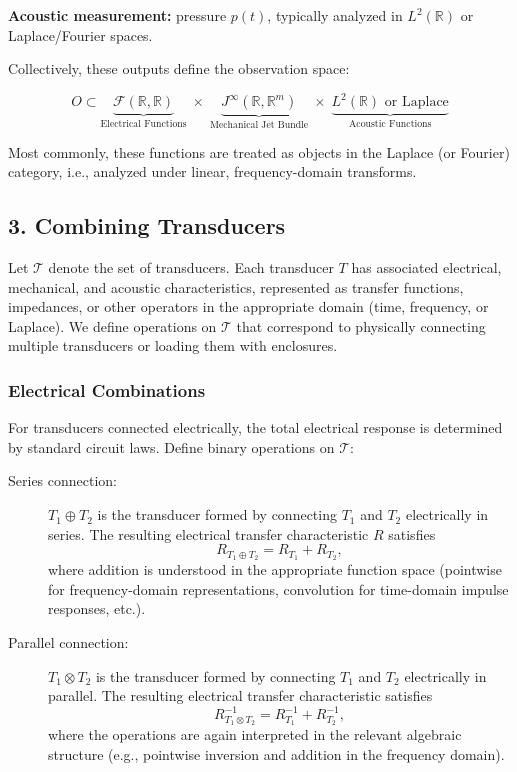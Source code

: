 \textbf{Acoustic measurement:} pressure \(p(t)\), typically analyzed in \(L^2(\mathbb{R})\) or Laplace/Fourier spaces.

Collectively, these outputs define the observation space:

\[
O \subset 
\underbrace{\mathcal{F}(\mathbb{R}, \mathbb{R})}_{\text{Electrical Functions}}
\;\times\;
\underbrace{J^\infty(\mathbb{R}, \mathbb{R}^m)}_{\text{Mechanical Jet Bundle}}
\;\times\;
\underbrace{L^2(\mathbb{R}) \text{ or Laplace}}_{\text{Acoustic Functions}}
\]

Most commonly, these functions are treated as objects in the Laplace (or Fourier) category, i.e., analyzed under linear, frequency-domain transforms.

\subsection*{3. Combining Transducers}

Let $\mathcal{T}$ denote the set of transducers. Each transducer $T$ has associated electrical, mechanical, and acoustic characteristics, represented as transfer functions, impedances, or other operators in the appropriate domain (time, frequency, or Laplace). We define operations on $\mathcal{T}$ that correspond to physically connecting multiple transducers or loading them with enclosures.

\subsubsection*{Electrical Combinations}

For transducers connected electrically, the total electrical response is determined by standard circuit laws. Define binary operations on $\mathcal{T}$:

\begin{description}
    \item[Series connection:] \(T_1 \oplus T_2\) is the transducer formed by connecting \(T_1\) and \(T_2\) electrically in series. The resulting electrical transfer characteristic \(R\) satisfies
    \[
    R_{T_1 \oplus T_2} = R_{T_1} + R_{T_2},
    \]
    where addition is understood in the appropriate function space (pointwise for frequency-domain representations, convolution for time-domain impulse responses, etc.).
    
    \item[Parallel connection:] \(T_1 \otimes T_2\) is the transducer formed by connecting \(T_1\) and \(T_2\) electrically in parallel. The resulting electrical transfer characteristic satisfies
    \[
    R_{T_1 \otimes T_2}^{-1} = R_{T_1}^{-1} + R_{T_2}^{-1},
    \]
    where the operations are again interpreted in the relevant algebraic structure (e.g., pointwise inversion and addition in the frequency domain).
\end{description}

